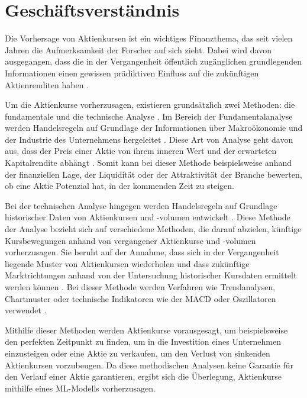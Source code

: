 \chapter{Geschäftsverständnis}\label{chp:geschaeftsverstaendnis}
Die Vorhersage von Aktienkursen ist ein wichtiges Finanzthema, das seit vielen Jahren die Aufmerksamkeit der Forscher auf sich zieht. Dabei wird davon ausgegangen, dass die in der Vergangenheit öffentlich zugänglichen grundlegenden Informationen einen gewissen prädiktiven Einfluss auf die zukünftigen Aktienrenditen haben \parencite[vgl.][S. 1]{.2013}.

Um die Aktienkurse vorherzusagen, existieren grundsätzlich zwei Methoden: die fundamentale und die technische Analyse \parencite[vgl.][S. 26f]{Petrusheva.2016}. Im Bereich der Fundamentalanalyse werden Handelsregeln auf Grundlage der Informationen über Makroökonomie und der Industrie des Unternehmens hergeleitet \parencite[vgl.][S. 1]{.2013}. Diese Art von Analyse geht davon aus, dass der Preis einer Aktie von ihrem inneren Wert und der erwarteten Kapitalrendite abhängt \parencite[vgl.][S. 453]{Tsang.2007}. Somit kann bei dieser Methode beispielsweise anhand der finanziellen Lage, der Liquidität oder der Attraktivität der Branche bewerten, ob eine Aktie Potenzial hat, in der kommenden Zeit zu steigen.

Bei der technischen Analyse hingegen werden Handelsregeln auf Grundlage historischer Daten von Aktienkursen und -volumen entwickelt \parencite[vgl.][S. 1]{.2013}. Diese Methode der Analyse bezieht sich auf verschiedene Methoden, die darauf abzielen, künftige Kursbewegungen anhand von vergangener Aktienkurse und -volumen vorherzusagen. Sie beruht auf der Annahme, dass sich in der Vergangenheit liegende Muster von Aktienkursen wiederholen und dass zukünftige Marktrichtungen anhand von der Untersuchung historischer Kursdaten ermittelt werden können \parencite[vgl.][S. 454]{Tsang.2007}. Bei dieser Methode werden Verfahren wie Trendanalysen, Chartmuster oder technische Indikatoren wie der \ac{MACD} oder Oszillatoren verwendet \parencite[vgl.][S. 293ff]{Mondello.2017}.

Mithilfe dieser Methoden werden Aktienkurse vorausgesagt, um beispielsweise den perfekten Zeitpunkt zu finden, um in die Investition eines Unternehmen einzusteigen oder eine Aktie zu verkaufen, um den Verlust von sinkenden Aktienkursen vorzubeugen. Da diese methodischen Analysen keine Garantie für den Verlauf einer Aktie garantieren, ergibt sich die Überlegung, Aktienkurse mithilfe eines ML-Modells vorherzusagen.